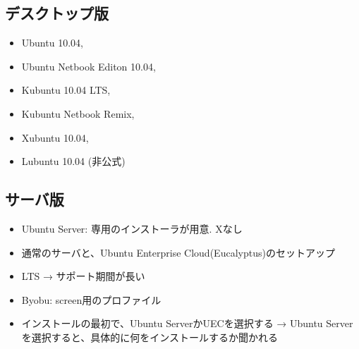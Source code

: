 \documentclass[mingoth,a4paper]{jsarticle}
\begin{document}
\begin{multicols}{2}
\subsection{デスクトップ版}

\begin{itemize}
      \item Ubuntu 10.04,
      \item Ubuntu Netbook Editon 10.04, 
      \item Kubuntu 10.04 LTS, 
      \item Kubuntu Netbook Remix, 
      \item Xubuntu 10.04, 
      \item Lubuntu 10.04 (非公式)
\end{itemize}

\subsection{サーバ版}

\begin{itemize}
      \item Ubuntu Server: 専用のインストーラが用意. Xなし
      \item 通常のサーバと、Ubuntu Enterprise Cloud(Eucalyptus)のセットアップ
      \item LTS → サポート期間が長い
      \item Byobu: screen用のプロファイル
      \item インストールの最初で、Ubuntu ServerかUECを選択する
    →
    Ubuntu Serverを選択すると、具体的に何をインストールするか聞かれる
\end{itemize}


\end{multicols}
\end{document}
